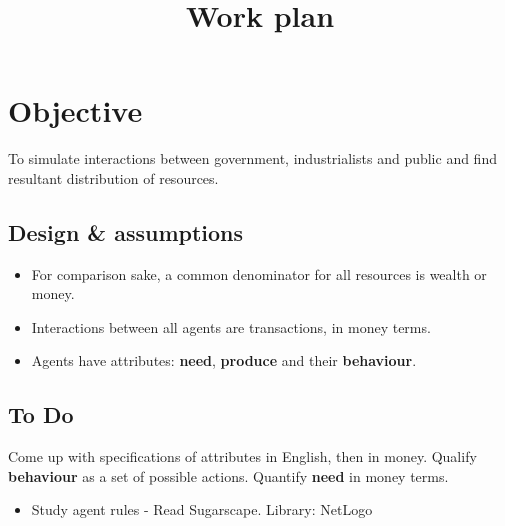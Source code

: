 \documentclass{article}
\begin{document}
\title{Work plan}
\maketitle
\section{Objective}
To simulate interactions between government, industrialists and public and find resultant distribution of resources. 

\subsection{Design \& assumptions}
\begin{itemize}
\item For comparison sake, a common denominator for all resources is wealth or money.
\item  Interactions between all agents are transactions, in money terms.
\item Agents have attributes: \textbf{need}, \textbf{produce} and their \textbf{behaviour}.
\end{itemize}

\subsection{To Do}
Come up with specifications of attributes in English, then in money. Qualify \textbf{behaviour} as a set of possible actions. Quantify \textbf{need} in money terms.

\begin{itemize}
\item Study agent rules - Read Sugarscape. Library: NetLogo
\end{itemize}
\end{document}
